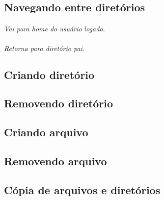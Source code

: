 \documentclass[a4paper,9pt]{extarticle}
\begin{document}
\begin{multicols}{2}
	
\subsection{Navegando entre diretórios}

	\paragraph{}
	\paragraph{} \emph{Vai para home do usuário logado.}
	\paragraph{} \emph{Retorna para diretório pai.}
	
	
\subsection{Criando diretório}


\subsection{Removendo diretório}

	
\subsection{Criando arquivo}
	
	
\subsection{Removendo arquivo}
	
	\paragraph{}
	
\subsection{Cópia de arquivos e diretórios} 

\end{multicols}
\end{document}
